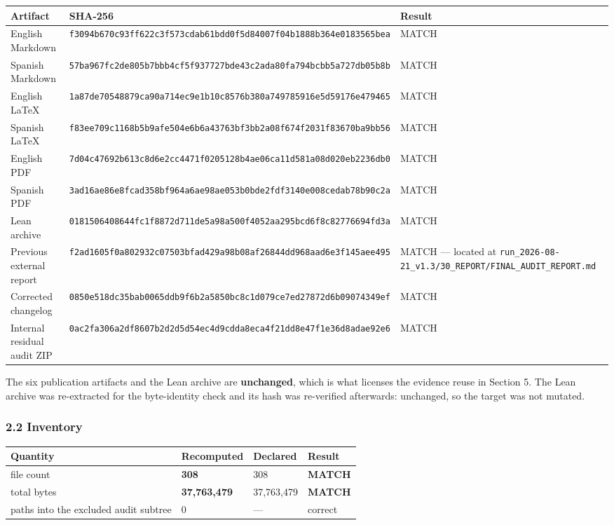 \documentclass[
  9pt,
  a4paper,
]{article}
\newcounter{none} %
\begin{document}
{\def\LTcaptype{none} %
\begin{longtable}[]{@{}lll@{}}
\toprule\noalign{}
Artifact & SHA-256 & Result \\
\midrule\noalign{}
\endhead
\bottomrule\noalign{}
\endlastfoot
English Markdown &
\texttt{f3094b670c93ff622c3f573cdab61bdd0f5d84007f04b1888b364e0183565bea}
& MATCH \\
Spanish Markdown &
\texttt{57ba967fc2de805b7bbb4cf5f937727bde43c2ada80fa794bcbb5a727db05b8b}
& MATCH \\
English LaTeX &
\texttt{1a87de70548879ca90a714ec9e1b10c8576b380a749785916e5d59176e479465}
& MATCH \\
Spanish LaTeX &
\texttt{f83ee709c1168b5b9afe504e6b6a43763bf3bb2a08f674f2031f83670ba9bb56}
& MATCH \\
English PDF &
\texttt{7d04c47692b613c8d6e2cc4471f0205128b4ae06ca11d581a08d020eb2236db0}
& MATCH \\
Spanish PDF &
\texttt{3ad16ae86e8fcad358bf964a6ae98ae053b0bde2fdf3140e008cedab78b90c2a}
& MATCH \\
Lean archive &
\texttt{0181506408644fc1f8872d711de5a98a500f4052aa295bcd6f8c82776694fd3a}
& MATCH \\
Previous external report &
\texttt{f2ad1605f0a802932c07503bfad429a98b08af26844dd968aad6e3f145aee495}
& MATCH --- located at
\texttt{run\_2026-08-21\_v1.3/30\_REPORT/FINAL\_AUDIT\_REPORT.md} \\
Corrected changelog &
\texttt{0850e518dc35bab0065ddb9f6b2a5850bc8c1d079ce7ed27872d6b09074349ef}
& MATCH \\
Internal residual audit ZIP &
\texttt{0ac2fa306a2df8607b2d2d5d54ec4d9cdda8eca4f21dd8e47f1e36d8adae92e6}
& MATCH \\
\end{longtable}
}

The six publication artifacts and the Lean archive are
\textbf{unchanged}, which is what licenses the evidence reuse in Section
5. The Lean archive was re-extracted for the byte-identity check and its
hash was re-verified afterwards: unchanged, so the target was not
mutated.

\subsubsection{2.2 Inventory}\label{22-inventory}

{\def\LTcaptype{none} %
\begin{longtable}[]{@{}llll@{}}
\toprule\noalign{}
Quantity & Recomputed & Declared & Result \\
\midrule\noalign{}
\endhead
\bottomrule\noalign{}
\endlastfoot
file count & \textbf{308} & 308 & \textbf{MATCH} \\
total bytes & \textbf{37,763,479} & 37,763,479 & \textbf{MATCH} \\
paths into the excluded audit subtree & 0 & --- & correct \\
\end{longtable}
}
\end{document}
